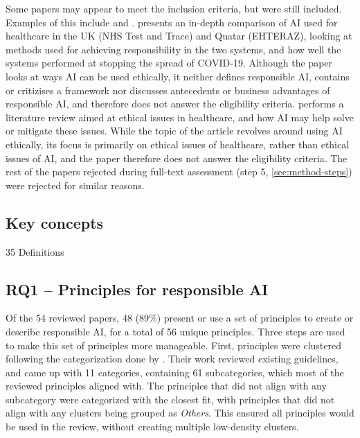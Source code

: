 Some papers may appear to meet the inclusion criteria, but were still included. Examples of this include \textcite{ElHaddadeh_2021} and \textcite{Trocin_2021}. \textcite{ElHaddadeh_2021} presents an in-depth comparison of AI used for healthcare in the UK (NHS Test and Trace) and Quatar (EHTERAZ), looking at methods used for achieving responsibility in the two systems, and how well the systems performed at stopping the spread of COVID-19. Although the paper looks at ways AI can be used ethically, it neither defines responsible AI, contains or critizises a framework nor discusses antecedents or business advantages of responsible AI, and therefore does not answer the eligibility criteria. \textcite{Trocin_2021} performs a literature review aimed at ethical issues in healthcare, and how AI may help solve or mitigate these issues. While the topic of the article revolves around using AI ethically, its focus is primarily on ethical issues of healthcare, rather than ethical issues of AI, and the paper therefore does not answer the eligibility criteria. The rest of the papers rejected during full-text assessment (step 5, \autoref{sec:method-steps}) were rejected for similar reasons.


\subsection{Key concepts}
{35 Definitions}


\subsection{RQ1 -- Principles for responsible AI}
\label{sec:results-rq1}
Of the 54 reviewed papers, 48 (89\%) present or use a set of principles to create or describe responsible AI, for a total of 56 unique principles. Three steps are used to make this set of principles more manageable. First, principles were clustered following the categorization done by \textcite{Ryan_2021}. Their work reviewed existing guidelines, and came up with 11 categories, containing 61 subcategories, which most of the reviewed principles aligned with. The principles that did not align with any subcategory were categorized with the closest fit, with principles that did not align with any clusters being grouped as \textit{Others}. This ensured all principles would be used in the review, without creating multiple low-density clusters.

